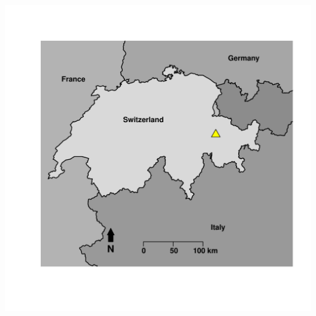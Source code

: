 \documentclass{article}\usepackage[]{graphicx}\usepackage[]{color}
\newenvironment{knitrout}{}{} %
\begin{document}
\begin{knitrout}
{\centering \includegraphics[width=1\textwidth]{figure/map-1} 

}



\end{knitrout}
\end{document}
